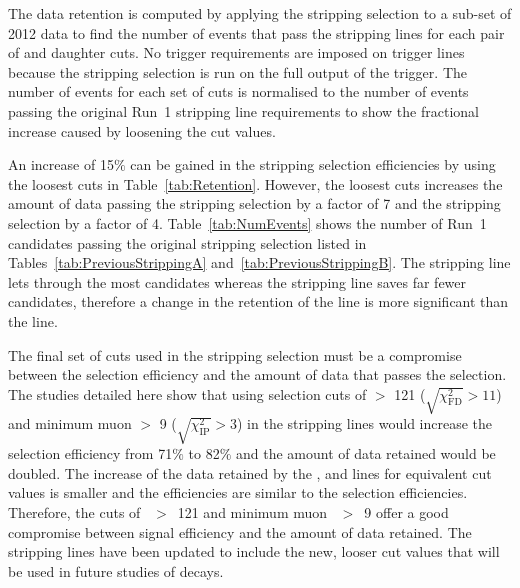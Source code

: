 The data retention is computed by applying the stripping selection to a sub-set of 2012 data to find the number of events that pass the stripping lines for each pair of \chiFD and daughter \chiIP cuts. No trigger requirements are imposed on trigger lines because the stripping selection is run on the full output of the trigger. The number of events for each set of cuts is normalised to the number of events passing the original Run~1 stripping line requirements to show the fractional increase caused by loosening the cut values. 

An increase of 15$\%$ can be gained in the stripping selection efficiencies by using the loosest cuts in Table~\ref{tab:Retention}. However, the loosest cuts increases the amount of data passing the \bmumu stripping selection by a factor of 7 and the \bhh stripping selection by a factor of 4. Table~\ref{tab:NumEvents} shows the number of Run~1 candidates passing the original stripping selection listed in Tables~\ref{tab:PreviousStrippingA} and~\ref{tab:PreviousStrippingB}. The \bhh stripping line lets through the most candidates whereas the \bmumu stripping line saves far fewer candidates, therefore a change in the retention of the \bhh line is more significant than the \bmumu line. 


The final set of cuts used in the stripping selection must be a compromise between the selection efficiency and the amount of data that passes the selection. The studies detailed here show that using selection cuts of \bs \chiFD $>$ 121 ($\sqrt{\chi^{2}_{\mathrm{FD}}} > 11$) and minimum muon \chiIP $>$ 9 ($\sqrt{\chi^{2}_{\mathrm{IP}}} > 3$) in the stripping lines would increase the \bmumu selection efficiency from 71$\%$ to 82$\%$ and the amount of data retained would be doubled. The increase of the data retained by the \bhh, \bujpsik and \bsjpsiphi lines for equivalent cut values is smaller and the efficiencies are similar to the \bmumu selection efficiencies. Therefore, the cuts of \bs \chiFD~$>$~121 and minimum muon \chiIP~$>$~9 offer a good compromise between signal efficiency and the amount of data retained. The stripping lines have been updated to include the new, looser cut values that will be used in future studies of \bmumu decays. 

